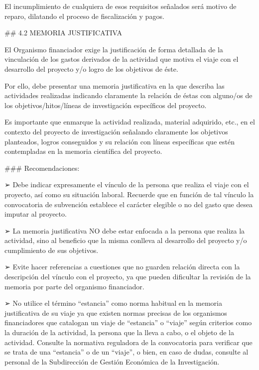 \documentclass{article}
\begin{document}
\begin{itemize}
\begin{itemize}
\begin{scriptsize}
                  El incumplimiento de cualquiera de esos requisitos señalados será motivo de reparo, dilatando el proceso de fiscalización y pagos.

                  \#\# 4.2 MEMORIA JUSTIFICATIVA

                  El Organismo financiador exige la justificación de forma detallada de la vinculación de los gastos derivados de la actividad que motiva el viaje con el desarrollo del proyecto y/o logro de los objetivos de éste.

                  Por ello, debe presentar una memoria justificativa en la que describa las actividades realizadas indicando claramente la relación de éstas con alguno/os de los objetivos/hitos/líneas de investigación específicos del proyecto.

                  Es importante que enmarque la actividad realizada, material adquirido, etc., en el contexto del proyecto de investigación señalando claramente los objetivos planteados, logros conseguidos y su relación con líneas específicas que estén contempladas en la memoria científica del proyecto.

                  \#\#\# Recomendaciones:

                  ➢ Debe indicar expresamente el vínculo de la persona que realiza el viaje con el proyecto, así como su situación laboral. Recuerde que en función de tal vínculo la convocatoria de subvención establece el carácter elegible o no del gasto que desea imputar al proyecto.

                  ➢ La memoria justificativa NO debe estar enfocada a la persona que realiza la actividad, sino al beneficio que la misma conlleva al desarrollo del proyecto y/o cumplimiento de sus objetivos.

                  ➢ Evite hacer referencias a cuestiones que no guarden relación directa con la descripción del vínculo con el proyecto, ya que pueden dificultar la revisión de la memoria por parte del organismo financiador.

                  ➢ No utilice el término “estancia” como norma habitual en la memoria justificativa de su viaje ya que existen normas precisas de los organismos financiadores que catalogan un viaje de “estancia” o “viaje” según criterios como la duración de la actividad, la persona que la lleva a cabo, o el objeto de la actividad. Consulte la normativa reguladora de la convocatoria para verificar que se trata de una “estancia” o de un “viaje”, o bien, en caso de dudas, consulte al personal de la Subdirección de Gestión Económica de la Investigación.


\end{scriptsize}
\end{itemize}
\end{itemize}
\end{document}
